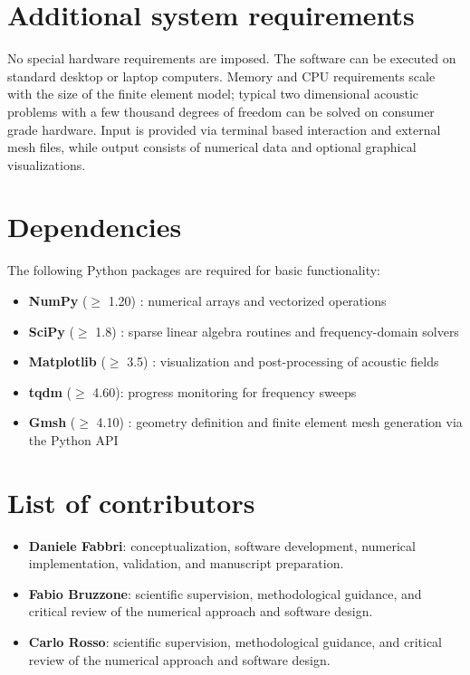\documentclass{jors}
\begin{document}
\section*{Additional system requirements}
No special hardware requirements are imposed. The software can be executed on standard desktop or laptop computers. Memory and CPU requirements scale with the size of the finite element model; typical two dimensional acoustic problems with a few thousand degrees of freedom can be solved on consumer grade hardware. Input is provided via terminal based interaction and external mesh files, while output consists of numerical data and optional graphical visualizations.

\section*{Dependencies}
The following Python packages are required for basic functionality:
\begin{itemize}
    \item \textbf{NumPy} ($\geq$ 1.20) \cite{Harris2020}: numerical arrays and vectorized operations
    \item \textbf{SciPy} ($\geq$ 1.8) \cite{Virtanen2020}: sparse linear algebra routines and frequency-domain solvers
    \item \textbf{Matplotlib} ($\geq$ 3.5) \cite{Hunter2007}: visualization and post-processing of acoustic fields
    \item \textbf{tqdm} ($\geq$ 4.60): progress monitoring for frequency sweeps
    \item \textbf{Gmsh} ($\geq$ 4.10) \cite{Gmsh2009}: geometry definition and finite element mesh generation via the Python API
\end{itemize}

\section*{List of contributors}

\begin{itemize}
    \item \textbf{Daniele Fabbri}: conceptualization, software development, numerical implementation, validation, and manuscript preparation.
    \item \textbf{Fabio Bruzzone}: scientific supervision, methodological guidance, and critical review of the numerical approach and software design.
    \item \textbf{Carlo Rosso}: scientific supervision, methodological guidance, and critical review of the numerical approach and software design.
\end{itemize}
\end{document}
